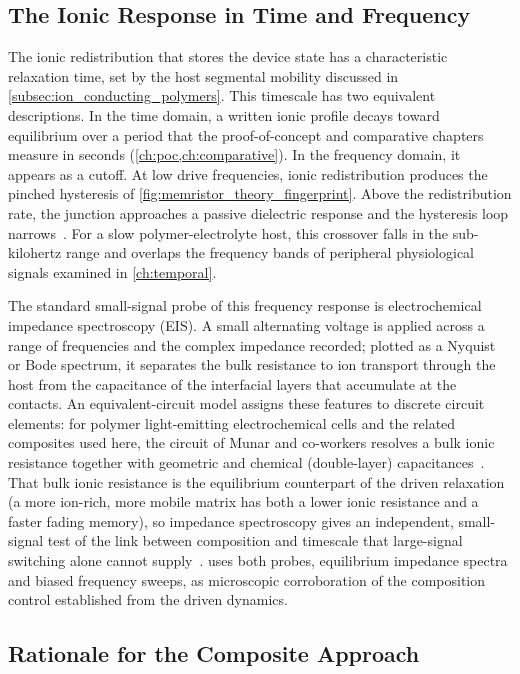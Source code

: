 \documentclass[12pt, twoside]{report}
\begin{document}
\subsection{The Ionic Response in Time and Frequency}\label{subsec:ion_frequency}

The ionic redistribution that stores the device state has a characteristic relaxation time, set by the host segmental mobility discussed in \cref{subsec:ion_conducting_polymers}. This timescale has two equivalent descriptions. In the time domain, a written ionic profile decays toward equilibrium over a period that the proof-of-concept and comparative chapters measure in seconds (\cref{ch:poc,ch:comparative}). In the frequency domain, it appears as a cutoff. At low drive frequencies, ionic redistribution produces the pinched hysteresis of \cref{fig:memristor_theory_fingerprint}. Above the redistribution rate, the junction approaches a passive dielectric response and the hysteresis loop narrows~\cite{ChuaKang1976, Chua2014}. For a slow polymer-electrolyte host, this crossover falls in the sub-kilohertz range and overlaps the frequency bands of peripheral physiological signals examined in \cref{ch:temporal}.

The standard small-signal probe of this frequency response is electrochemical impedance spectroscopy (EIS). A small alternating voltage is applied across a range of frequencies and the complex impedance recorded; plotted as a Nyquist or Bode spectrum, it separates the bulk resistance to ion transport through the host from the capacitance of the interfacial layers that accumulate at the contacts. An equivalent-circuit model assigns these features to discrete circuit elements: for polymer light-emitting electrochemical cells and the related composites used here, the circuit of Munar and co-workers resolves a bulk ionic resistance together with geometric and chemical (double-layer) capacitances~\cite{Munar2012}. That bulk ionic resistance is the equilibrium counterpart of the driven relaxation (a more ion-rich, more mobile matrix has both a lower ionic resistance and a faster fading memory), so impedance spectroscopy gives an independent, small-signal test of the link between composition and timescale that large-signal switching alone cannot supply~\cite{BruceVincent1993, Gray1991}.  uses both probes, equilibrium impedance spectra and biased frequency sweeps, as microscopic corroboration of the composition control established from the driven dynamics.

\subsection{Rationale for the Composite Approach}\label{subsec:composite_rationale}
\end{document}

